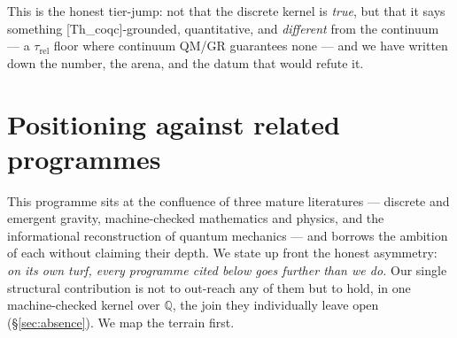 \documentclass[10pt,twocolumn]{article}
\theoremstyle{definition}
\newcommand{\Thq}{\textsf{[Th\_coqc]}}
\begin{document}
This is the honest tier-jump: not that the discrete kernel is \emph{true}, but that it
says something \Thq{}-grounded, quantitative, and \emph{different} from the continuum ---
a $\tau_{\mathrm{rel}}$ floor where continuum QM/GR guarantees none --- and we have written down the
number, the arena, and the datum that would refute it.

\section{Positioning against related programmes}\label{sec:positioning}

This programme sits at the confluence of three mature literatures --- discrete and
emergent gravity, machine-checked mathematics and physics, and the informational
reconstruction of quantum mechanics --- and borrows the ambition of each without claiming
their depth. We state up front the honest asymmetry: \emph{on its own turf, every
programme cited below goes further than we do.} Our single structural contribution is not
to out-reach any of them but to hold, in one machine-checked kernel over $\mathbb{Q}$, the
join they individually leave open (\S\ref{sec:absence}). We map the terrain first.
\end{document}
